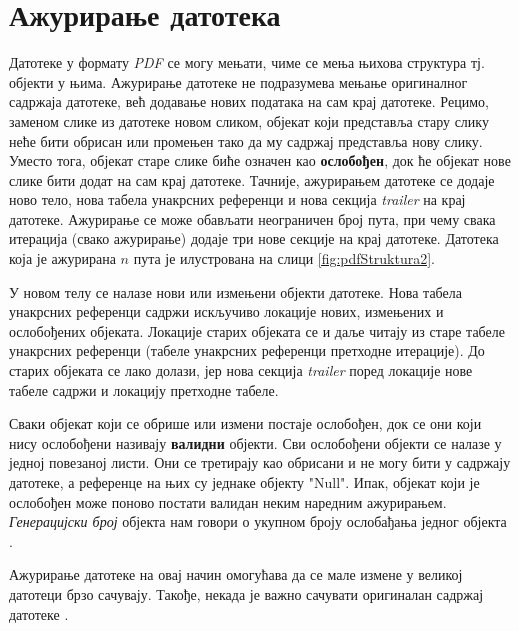 \documentclass[12pt,oneside]{memoir}
\begin{document}
\section{Ажурирање датотека}
\label{sec:azuriranje}

Датотеке у формату \textit{PDF} се могу мењати, чиме се мења њихова структура тј. објекти у њима. Ажурирање датотеке не подразумева мењање оригиналног садржаја датотеке, већ додавање нових података на сам крај датотеке. Рецимо, заменом слике из датотеке новом сликом, објекат који представља стару слику неће бити обрисан или промењен тако да му садржај представља нову слику. Уместо тога, објекат старе слике биће означен као \textbf{ослобођен}, док ће објекат нове слике бити додат на сам крај датотеке. Тачније, ажурирањем датотеке се додаје ново тело, нова табела унакрсних референци и нова секција \textit{trailer} на крај датотеке. Ажурирање се може обављати неограничен број пута, при чему свака итерација (свако ажурирање) додаје три нове секције на крај датотеке. Датотека која је ажурирана $n$ пута је илустрована на слици \ref{fig:pdfStruktura2}. 

У новом телу се налазе нови или измењени објекти датотеке. Нова табела унакрсних референци садржи искључиво локације нових, измењених и ослобођених објеката. Локације старих објеката се и даље читају из старе табеле унакрсних референци (табеле унакрсних референци претходне итерације). До старих објеката се лако долази, јер нова секција \textit{trailer} поред локације нове табеле садржи и локацију претходне табеле. 

Сваки објекат који се обрише или измени постаје ослобођен, док се они који нису ослобођени називају \textbf{валидни} објекти. Сви ослобођени објекти се налазе у једној повезаној листи. Они се третирају као обрисани и не могу бити у садржају датотеке, а референце на њих су једнаке објекту "Null". Ипак, објекат који је ослобођен може поново постати валидан неким наредним ажурирањем. \textit{Генерацијски број} објекта нам говори о укупном броју ослобађања једног објекта \cite{PDFDoc, introToPdf, basicStrPdf}.

Ажурирање датотеке на овај начин омогућава да се мале измене у великој датотеци брзо сачувају. Такође, некада је важно сачувати оригиналан садржај датотеке \cite{PDFDoc}.
\end{document}
